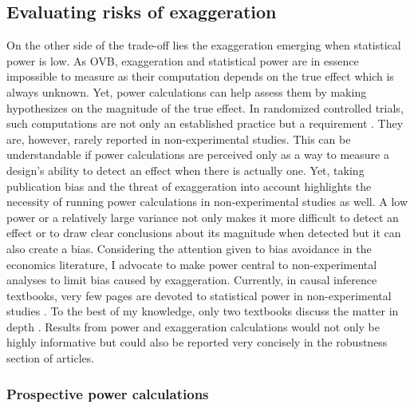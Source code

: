 \documentclass[usletter, 12pt]{article}
\begin{document}
		\subsection{Evaluating risks of exaggeration}

			On the other side of the trade-off lies the exaggeration emerging when statistical power is low. As OVB, exaggeration and statistical power are in essence impossible to measure as their computation depends on the true effect which is always unknown. Yet, power calculations can help assess them by making hypothesizes on the magnitude of the true effect. In randomized controlled trials, such computations are not only an established practice but a requirement \citep{duflo_using_2007, mcconnell_going_2015, athey_econometrics_2016}. They are, however, rarely reported in non-experimental studies. This can be understandable if power calculations are perceived only as a way to measure a design's ability to detect an effect when there is actually one. Yet, taking publication bias and the threat of exaggeration into account highlights the necessity of running power calculations in non-experimental studies as well. A low power or a relatively large variance not only makes it more difficult to detect an effect or to draw clear conclusions about its magnitude when detected but it can also create a bias. Considering the attention given to bias avoidance in the economics literature, I advocate to make power central to non-experimental analyses to limit bias caused by exaggeration. Currently, in causal inference textbooks, very few pages are devoted to statistical power in non-experimental studies \citep{angrist_mostly_2009, angrist_mastering_2014, imbens_causal_2015, cunningham_causal_2021}. To the best of my knowledge, only two textbooks discuss the matter in depth \citep{shadish_experimental_2002, huntington-klein_effect_2021}. Results from power and exaggeration calculations would not only be highly informative but could also be reported very concisely in the robustness section of articles. 
			
			\subsubsection{Prospective power calculations}
						
\end{document}
